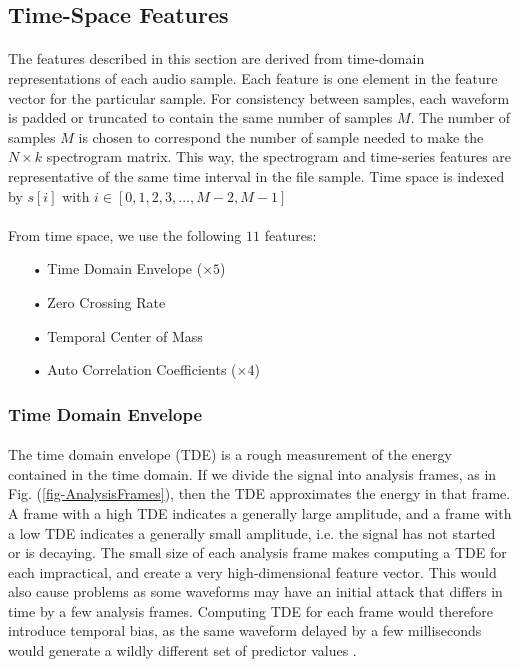 \documentclass[12pt,letterpaper]{article}
\begin{document}

\subsection{Time-Space Features}
\label{subsec-TimeFeatures}

\paragraph*{}The features described in this section are derived from time-domain representations of each audio sample. Each feature is one element in the feature vector for the particular sample. For consistency between samples, each waveform is padded or truncated to contain the same number of samples $M$. The number of samples $M$ is chosen to correspond the number of sample needed to make the $N \times k$ spectrogram matrix. This way, the spectrogram and time-series features are representative of the same time interval in the file sample. Time space is indexed by $s[i]$ with $i \in [0,1,2,3,...,M-2,M-1]$

\paragraph*{}From time space, we use the following $11$ features:
\begin{itemize}
\item[•] Time Domain Envelope ($\times 5$)
\item[•] Zero Crossing Rate
\item[•] Temporal Center of Mass
\item[•] Auto Correlation Coefficients ($\times 4$)
\end{itemize}


\subsubsection{Time Domain Envelope}

\paragraph*{}The time domain envelope (TDE) is a rough measurement of the energy contained in the time domain. If we divide the signal into analysis frames, as in Fig. (\ref{fig-AnalysisFrames}), then the TDE approximates the energy in that frame. A frame with a high TDE indicates a generally large amplitude, and a frame with a low TDE indicates a generally small amplitude, i.e. the signal has not started or is decaying. The small size of each analysis frame makes computing a TDE for each impractical, and create a very high-dimensional feature vector. This would also cause problems as some waveforms may have an initial attack that differs in time by a few analysis frames. Computing TDE for each frame would therefore introduce temporal bias, as the same waveform delayed by a few milliseconds would generate a wildly different set of predictor values \cite{Serizel}. 
\end{document}
